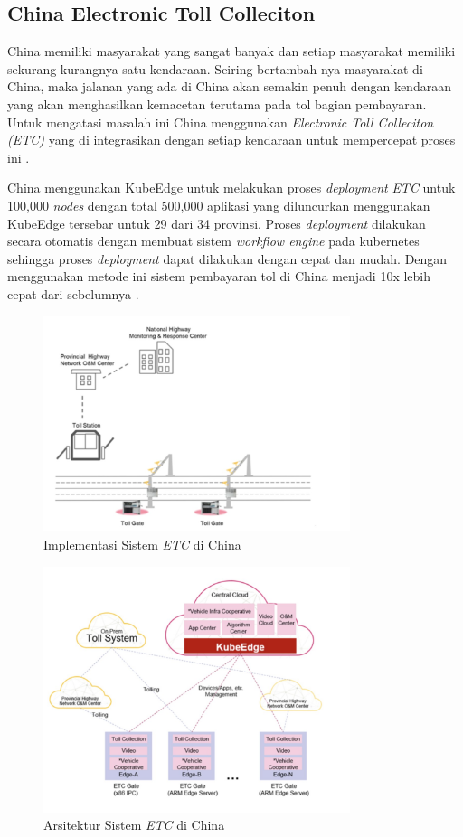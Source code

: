 
\subsection{China Electronic Toll Colleciton}
China memiliki masyarakat yang sangat banyak dan setiap masyarakat memiliki sekurang kurangnya satu kendaraan. Seiring bertambah nya masyarakat di China, maka jalanan yang ada di China akan semakin penuh dengan kendaraan yang akan menghasilkan kemacetan terutama pada tol bagian pembayaran. Untuk mengatasi masalah ini China menggunakan \textit{Electronic Toll Colleciton (ETC)} yang di integrasikan dengan setiap kendaraan untuk mempercepat proses ini \parencite{penelitianterkait1}.

China menggunakan KubeEdge untuk melakukan proses \textit{deployment} \textit{ETC} untuk 100,000 \textit{nodes} dengan total 500,000 aplikasi yang diluncurkan menggunakan KubeEdge tersebar untuk 29 dari 34 provinsi. Proses \textit{deployment} dilakukan secara otomatis dengan membuat sistem \textit{workflow engine} pada kubernetes sehingga proses \textit{deployment} dapat dilakukan dengan cepat dan mudah. Dengan menggunakan metode ini sistem pembayaran tol di China menjadi 10x lebih cepat dari sebelumnya \parencite{penelitianterkait1}.

\begin{figure}[ht]
  \centering
  \includegraphics[width=0.8\textwidth]{resources/chapter-2/china-highways.jpg}
  \caption{Implementasi Sistem \textit{ETC} di China \parencite{penelitianterkait1}}
  \label{fig:china-highways}
\end{figure}

\begin{figure}[ht]
  \includegraphics[width=0.8\textwidth]{resources/chapter-2/arsitektur-china-highways.jpg}
  \caption{Arsitektur Sistem \textit{ETC} di China \parencite{penelitianterkait1}}
  \label{fig:architecture-china-highways}
\end{figure}
